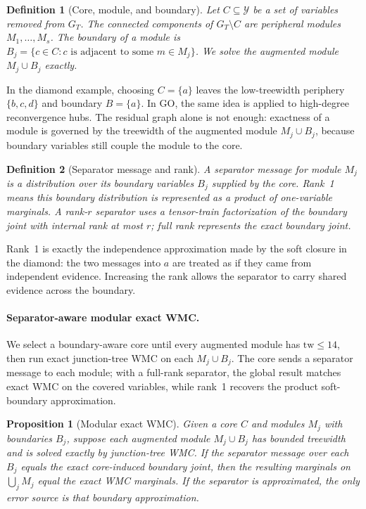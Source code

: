 \documentclass[letterpaper]{article}
\newcommand{\tw}{\ensuremath{\mathrm{tw}}}
\newtheorem{definition}{Definition}
\newtheorem{proposition}{Proposition}
\begin{document}
\begin{definition}[Core, module, and boundary]\label{def:module}
Let $C\subseteq\mathcal{Y}$ be a set of variables removed from $G_T$. The connected components of $G_T\setminus C$ are \emph{peripheral modules} $M_1,\dots,M_s$. The boundary of a module is $B_j=\{c\in C: c \text{ is adjacent to some } m\in M_j\}$. We solve the \emph{augmented module} $M_j\cup B_j$ exactly.
\end{definition}

In the diamond example, choosing $C=\{a\}$ leaves the low-treewidth periphery $\{b,c,d\}$ and boundary $B=\{a\}$. In GO, the same idea is applied to high-degree reconvergence hubs. The residual graph alone is not enough: exactness of a module is governed by the treewidth of the augmented module $M_j\cup B_j$, because boundary variables still couple the module to the core.

\begin{definition}[Separator message and rank]\label{def:separator}
A separator message for module $M_j$ is a distribution over its boundary variables $B_j$ supplied by the core. Rank~1 means this boundary distribution is represented as a product of one-variable marginals. A rank-$r$ separator uses a tensor-train factorization of the boundary joint with internal rank at most $r$; full rank represents the exact boundary joint.
\end{definition}

Rank~1 is exactly the independence approximation made by the soft closure in the diamond: the two messages into $a$ are treated as if they came from independent evidence. Increasing the rank allows the separator to carry shared evidence across the boundary.

\paragraph{Separator-aware modular exact WMC.}
We select a boundary-aware core until every augmented module has $\tw\le14$, then run exact junction-tree WMC on each $M_j\cup B_j$. The core sends a separator message to each module; with a full-rank separator, the global result matches exact WMC on the covered variables, while rank~1 recovers the product soft-boundary approximation.

\begin{proposition}[Modular exact WMC]\label{prop:modular}
Given a core $C$ and modules $M_j$ with boundaries $B_j$, suppose each augmented module $M_j\cup B_j$ has bounded treewidth and is solved exactly by junction-tree WMC. If the separator message over each $B_j$ equals the exact core-induced boundary joint, then the resulting marginals on $\bigcup_j M_j$ equal the exact WMC marginals. If the separator is approximated, the only error source is that boundary approximation.
\end{proposition}
\end{document}
